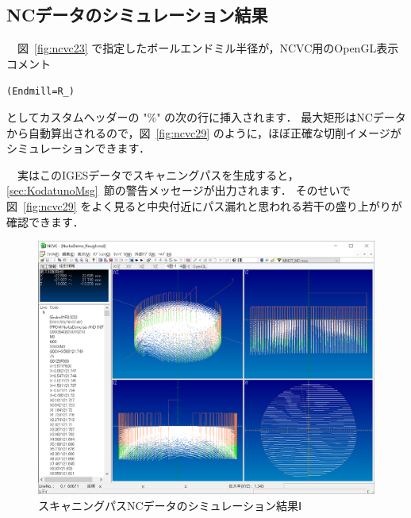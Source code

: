 \subsection{NCデータのシミュレーション結果}
　図~\ref{fig:ncvc23} で指定したボールエンドミル半径が，NCVC用のOpenGL表示コメント

\vspace*{0.5zh}
\begin{breakbox}
\vspace*{-0.25cm}
\small
\begin{alltt}
(Endmill=R_)
\end{alltt}
\vspace*{-0.1cm}
\end{breakbox}

としてカスタムヘッダーの "\%" の次の行に挿入されます．
最大矩形はNCデータから自動算出されるので，図~\ref{fig:ncvc29} のように，ほぼ正確な切削イメージがシミュレーションできます．

　実はこのIGESデータでスキャニングパスを生成すると，\ref{sec:KodatunoMsg}~節の警告メッセージが出力されます．
そのせいで 図~\ref{fig:ncvc29} をよく見ると中央付近にパス漏れと思われる若干の盛り上がりが確認できます．

\begin{figure}[H]
\centering
\includegraphics[scale=0.5]{No2/fig/fig28.png}
\caption{スキャニングパスNCデータのシミュレーション結果Ⅰ}
\label{fig:ncvc28}
\end{figure}

